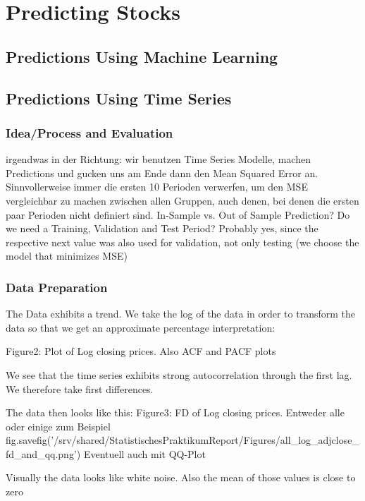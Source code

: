 \chapter{Predicting Stocks}\label{ch:predictions}


\section{Predictions Using Machine Learning}

\section{Predictions Using Time Series}
\subsection{Idea/Process and Evaluation}
irgendwas in der Richtung: wir benutzen Time Series Modelle, machen Predictions und gucken uns am Ende dann den Mean Squared Error an. Sinnvollerweise immer die ersten 10 Perioden verwerfen, um den MSE vergleichbar zu machen zwischen allen Gruppen, auch denen, bei denen die ersten paar Perioden nicht definiert sind. 	
In-Sample vs. Out of Sample Prediction?
Do we need a Training, Validation and Test Period? Probably yes, since the respective next value was also used for validation, not only testing (we choose the model that minimizes MSE)

\subsection{Data Preparation}

The Data exhibits a trend. We take the log of the data in order to transform the data so that we get an approximate percentage interpretation:

Figure2: Plot of Log closing prices.
Also ACF and PACF plots

We see that the time series exhibits strong autocorrelation through the first lag. We therefore take first differences. 

The data then looks like this: 
Figure3: FD of Log closing prices. Entweder alle oder einige zum Beispiel
fig.savefig('/srv/shared/StatistischesPraktikumReport/Figures/all_log_adjclose_fd_and_qq.png')
Eventuell auch mit QQ-Plot

Visually the data looks like white noise. Also the mean of those values is close to zero

